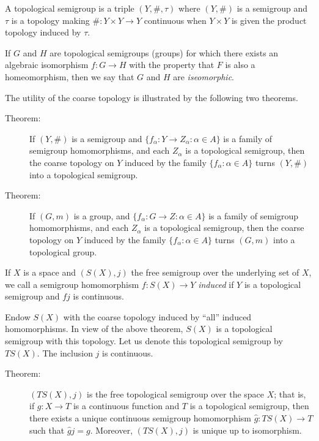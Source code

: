\documentclass{article}
\begin{document}
A topological semigroup is a triple $(Y,\#,\tau)$ where $(Y,\#)$ is a semigroup and $\tau$ is a topology making $\#: Y \times Y \rightarrow Y$ continuous when $Y \times Y$ is given the product topology induced by $\tau$.

If $G$ and $H$ are topological semigroups (groups) for which there exists an algebraic isomorphism $f: G \rightarrow H$ with the property that $F$ is also a homeomorphism, then we say that $G$ and $H$ are \emph{iseomorphic}.

The utility of the coarse topology is illustrated by the following two theorems.

\begin{description}

\item[Theorem:] If $(Y,\#)$ is a semigroup and $\{ f_{\alpha}: Y \rightarrow Z_{\alpha}: \alpha \in A \}$ is a family of semigroup homomorphisms, and each $Z_{\alpha}$ is a topological semigroup, then the coarse topology on $Y$ induced by the family $\{ f_{\alpha}: \alpha \in A \}$ turns $(Y,\#)$ into a topological semigroup.

\item[Theorem:] If $(G,m)$ is a group, and $\{ f_{\alpha}: G \rightarrow Z : \alpha \in A \}$ is a family of semigroup homomorphisms, and each $Z_{\alpha}$ is a topological semigroup, then the coarse topology on $Y$ induced by the family $\{ f_{\alpha}: \alpha \in A \}$ turns $(G,m)$ into a topological group.

\end{description}

If $X$ is a space and $(S(X),j)$ the free semigroup over the underlying set of $X$, we call a semigroup homomorphism $f: S(X) \rightarrow Y$ \emph{induced} if $Y$ is a topological semigroup and $fj$ is continuous.

Endow $S(X)$ with the coarse topology induced by ``all'' induced homomorphisms. In view of the above theorem, $S(X)$ is a topological semigroup with this topology. Let us denote this topological semigroup by $TS(X)$. The inclusion $j$ is continuous.

\begin{description}

\item[Theorem:] $(TS(X),j)$ is the free topological semigroup over the space $X$; that is, if $g: X \rightarrow T$ is a continuous function and $T$ is a topological semigroup, then there exists a unique continuous semigroup homomorphism $\hat{g}: TS(X) \rightarrow T$ such that $\hat{g}j = g$. Moreover, $(TS(X), j)$ is unique up to isomorphism.

\end{description}
\end{document}
